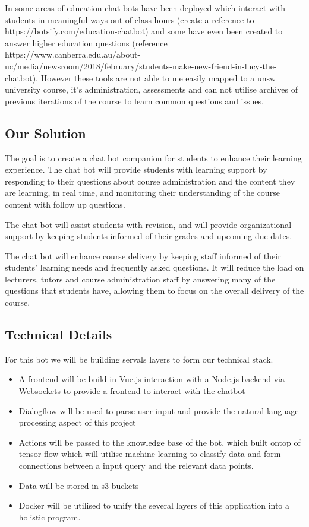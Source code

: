 \documentclass{article}
\begin{document}
In some areas of education chat bots have been deployed which interact with students in meaningful ways out of class hours (create a reference to https://botsify.com/education-chatbot) and some have even been created to answer higher education questions (reference https://www.canberra.edu.au/about-uc/media/newsroom/2018/february/students-make-new-friend-in-lucy-the-chatbot). However these tools are not able to me easily mapped to a unsw university course, it's administration, assessments and can not utilise archives of previous iterations of the course to learn common questions and issues.

\subsection{Our Solution}

The goal is to create a chat bot companion for students to enhance their learning experience. The chat bot will provide students with learning support by responding to their questions about course administration and the content they are learning, in real time, and monitoring their understanding of the course content with follow up questions.

The chat bot will assist students with revision, and will provide organizational support by keeping students 
informed of their grades and upcoming due dates.

The chat bot will enhance course delivery by keeping staff informed of their students' learning needs and frequently asked questions. It will reduce the load on lecturers, tutors and course administration staff by answering many of the questions that students have, allowing them to focus on the overall delivery of the course. 

\subsection{Technical Details}

For this bot we will be building servals layers to form our technical stack.

\begin{itemize}
  \item A frontend will be build in Vue.js interaction with a Node.js backend via Websockets to provide a frontend to interact with the chatbot
  \item Dialogflow will be used to parse user input and provide the natural language processing aspect of this project
  \item Actions will be passed to the knowledge base of the bot, which built ontop of tensor flow which will utilise machine learning to classify data and form connections between a input query and the relevant data points.
  \item Data will be stored in s3 buckets
  \item Docker will be utilised to unify the several layers of this application into a holistic program. 
\end{itemize}
\end{document}
